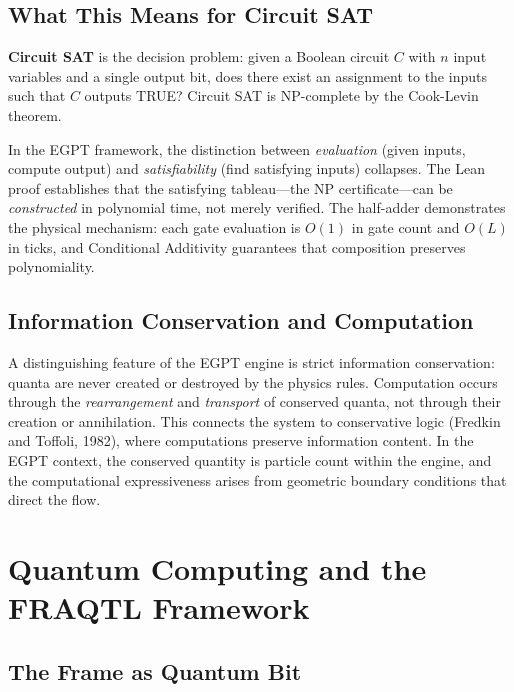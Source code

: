 \documentclass[11pt,a4paper]{article}
\begin{document}
\subsection{What This Means for Circuit SAT}

\textbf{Circuit SAT} is the decision problem: given a Boolean circuit $C$ with $n$ input variables and a single output bit, does there exist an assignment to the inputs such that $C$ outputs TRUE? Circuit SAT is NP-complete by the Cook-Levin theorem.

In the EGPT framework, the distinction between \emph{evaluation} (given inputs, compute output) and \emph{satisfiability} (find satisfying inputs) collapses. The Lean proof establishes that the satisfying tableau---the NP certificate---can be \emph{constructed} in polynomial time, not merely verified. The half-adder demonstrates the physical mechanism: each gate evaluation is $O(1)$ in gate count and $O(L)$ in ticks, and Conditional Additivity guarantees that composition preserves polynomiality.

\subsection{Information Conservation and Computation}

A distinguishing feature of the EGPT engine is strict information conservation: quanta are never created or destroyed by the physics rules. Computation occurs through the \emph{rearrangement} and \emph{transport} of conserved quanta, not through their creation or annihilation. This connects the system to conservative logic (Fredkin and Toffoli, 1982), where computations preserve information content. In the EGPT context, the conserved quantity is particle count within the engine, and the computational expressiveness arises from geometric boundary conditions that direct the flow.


\section{Quantum Computing and the FRAQTL Framework}
\label{sec:quantum}

\subsection{The Frame as Quantum Bit}
\end{document}
